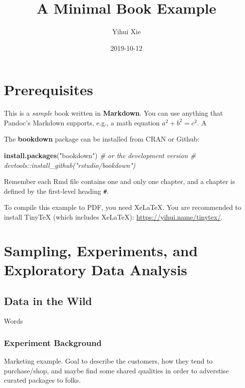 \documentclass[]{book}
\title{A Minimal Book Example}
\author{Yihui Xie}
\date{2019-10-12}
\newenvironment{Shaded}{\begin{snugshade}}{\end{snugshade}}
\newcommand{\KeywordTok}[1]{\textcolor[rgb]{0.13,0.29,0.53}{\textbf{#1}}}
\newcommand{\StringTok}[1]{\textcolor[rgb]{0.31,0.60,0.02}{#1}}
\newcommand{\CommentTok}[1]{\textcolor[rgb]{0.56,0.35,0.01}{\textit{#1}}}
\newcommand{\NormalTok}[1]{#1}
\begin{document}
\maketitle

{
\setcounter{tocdepth}{1}
\tableofcontents
}
\chapter{Prerequisites}\label{prerequisites}

This is a \emph{sample} book written in \textbf{Markdown}. You can use
anything that Pandoc's Markdown supports, e.g., a math equation
\(a^2 + b^2 = c^2\). A

The \textbf{bookdown} package can be installed from CRAN or Github:

\begin{Shaded}
\begin{Highlighting}[]
\KeywordTok{install.packages}\NormalTok{(}\StringTok{"bookdown"}\NormalTok{)}
\CommentTok{# or the development version}
\CommentTok{# devtools::install_github("rstudio/bookdown")}
\end{Highlighting}
\end{Shaded}

Remember each Rmd file contains one and only one chapter, and a chapter
is defined by the first-level heading \texttt{\#}.

To compile this example to PDF, you need XeLaTeX. You are recommended to
install TinyTeX (which includes XeLaTeX):
\url{https://yihui.name/tinytex/}.

\chapter{Sampling, Experiments, and Exploratory Data
Analysis}\label{sampling-experiments-and-exploratory-data-analysis}

\section{Data in the Wild}\label{data-in-the-wild}

Words

\subsection{Experiment Background}\label{experiment-background}

Marketing example. Goal to describe the customers, how they tend to
purchase/shop, and maybe find some shared qualities in order to
adverstise curated packages to folks.
\end{document}
